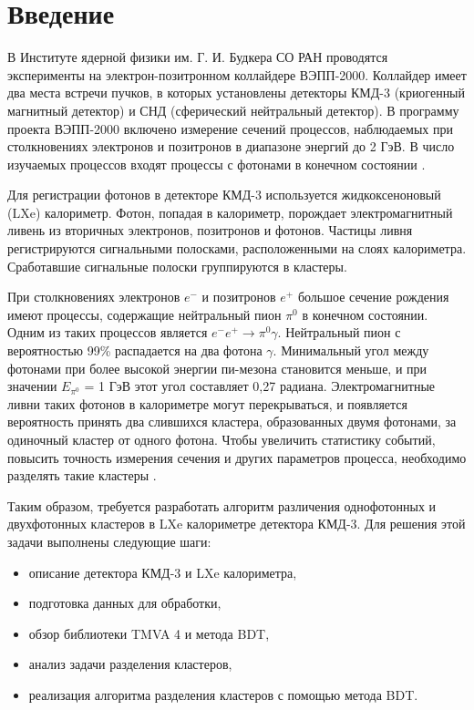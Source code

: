 \documentclass[14pt]{extarticle}
\begin{document}
	\setlength{\abovedisplayskip}{6pt}
	\setlength{\belowdisplayskip}{6pt}
	\setlength{\belowcaptionskip}{-15pt}
	\setcounter{page}{3}
	\thispagestyle{fancy}
\tableofcontents
\newpage
\section{Введение}
В Институте ядерной физики им. Г. И. Будкера СО РАН проводятся эксперименты на электрон-позитронном коллайдере ВЭПП-2000. Коллайдер имеет два места встречи пучков, в которых установлены детекторы КМД-3 (криогенный магнитный детектор) и СНД (сферический нейтральный детектор). В программу проекта ВЭПП-2000 включено измерение сечений процессов, наблюдаемых при столкновениях электронов и позитронов в диапазоне энергий до 2 ГэВ. В число изучаемых процессов входят процессы с фотонами в конечном состоянии \cite{shatunov}.

Для регистрации фотонов в детекторе КМД-3 используется жидкоксеноновый (LXe) калориметр. Фотон, попадая в калориметр, порождает электромагнитный ливень из вторичных электронов, позитронов и фотонов. Частицы ливня регистрируются сигнальными полосками, расположенными на слоях калориметра. Сработавшие сигнальные полоски группируются в кластеры.

При столкновениях электронов $e^-$ и позитронов $e^+$ большое сечение рождения имеют процессы, содержащие нейтральный пион $\pi^0$ в конечном состоянии. Одним из таких процессов является $e^- e^+ \rightarrow \pi^0 \gamma$. Нейтральный пион с вероятностью 99\% распадается на два фотона $\gamma$. Минимальный угол между фотонами при более высокой энергии пи-мезона становится меньше, и при значении $E_{\pi^0}$ = 1 ГэВ этот угол составляет 0,27 радиана. Электромагнитные ливни таких фотонов в калориметре могут перекрываться, и появляется вероятность принять два слившихся кластера, образованных двумя фотонами, за одиночный кластер от одного фотона. Чтобы увеличить статистику событий, повысить точность измерения сечения и других параметров процесса, необходимо разделять такие кластеры \cite{lakomov}.

Таким образом, требуется разработать алгоритм различения однофотонных и двухфотонных кластеров в LXe калориметре детектора КМД-3. Для решения этой задачи выполнены следующие шаги:
\begin{itemize}
	\item описание детектора КМД-3 и LXe калориметра,
	\item подготовка данных для обработки,
	\item обзор библиотеки TMVA 4 и метода BDT,
	\item анализ задачи разделения кластеров,
	\item реализация алгоритма разделения кластеров с помощью метода BDT.
\end{itemize}
\end{document}
